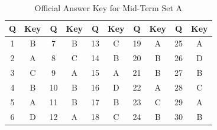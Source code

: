 \begin{table}[h]
\centering\small
\begin{tabular}{|c|c||c|c||c|c||c|c||c|c|}
\hline
\textbf{Q} & \textbf{Key} & \textbf{Q} & \textbf{Key} & \textbf{Q} & \textbf{Key} & \textbf{Q} & \textbf{Key} & \textbf{Q} & \textbf{Key} \\ \hline
1 & B & 7 & B & 13 & C & 19 & A & 25 & A \\ \hline
2 & A & 8 & C & 14 & B & 20 & B & 26 & D \\ \hline
3 & C & 9 & A & 15 & A & 21 & B & 27 & B \\ \hline
4 & B & 10 & B & 16 & D & 22 & A & 28 & C \\ \hline
5 & A & 11 & B & 17 & B & 23 & C & 29 & A \\ \hline
6 & D & 12 & A & 18 & C & 24 & B & 30 & B \\ \hline
\end{tabular}
\caption{Official Answer Key for Mid-Term Set A}
\end{table}

\newpage
